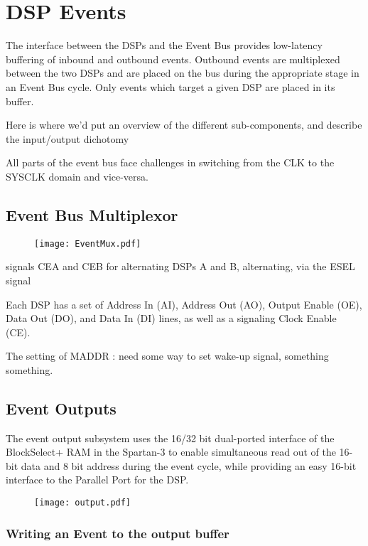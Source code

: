 \section{DSP Events}

The interface between the DSPs and the Event Bus provides low-latency
buffering of inbound and outbound events. Outbound events are
multiplexed between the two DSPs and are placed on the bus during the
appropriate stage in an Event Bus cycle. Only events which target a
given DSP are placed in its buffer.

Here is where we'd put an overview of the different sub-components,
and describe the input/output dichotomy

All parts of the event bus face challenges in switching from the CLK
to the SYSCLK domain and vice-versa.

\subsection{Event Bus Multiplexor}
\begin{figure}
\texttt{[image: EventMux.pdf]}
\end{figure}
      
      signals CEA and CEB for alternating DSPs A and B, alternating, via the ESEL signal
      
      Each DSP has a set of Address In (AI), Address Out (AO), Output Enable (OE), Data Out (DO), and Data In (DI) lines, as well as a signaling Clock Enable (CE). 

      The setting of MADDR : need some way to set wake-up signal, something something. 

      

\subsection{Event Outputs}

The event output subsystem uses the 16/32 bit dual-ported interface of
the BlockSelect+ RAM in the Spartan-3 to enable simultaneous read out
of the 16-bit data and 8 bit address during the event cycle, while
providing an easy 16-bit interface to the Parallel Port for the DSP.
\begin{figure}
\texttt{[image: output.pdf]}
\end{figure}



\subsubsection{Writing an Event to the output buffer}



